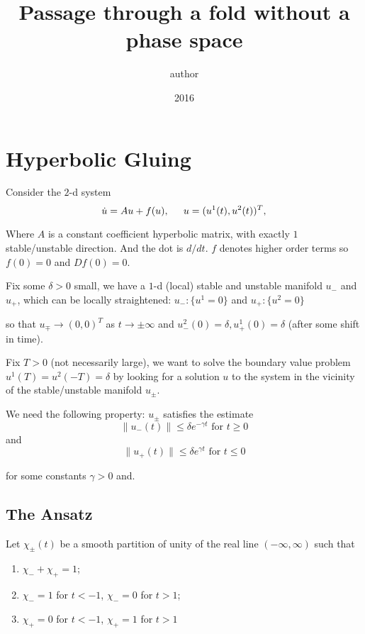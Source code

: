 \documentclass[letterpaper,11pt]{article}
\title{Passage through a fold without a phase space}
\author{author}
\date{2016}
\numberwithin{equation}{section}
\theoremstyle{plain}
\begin{document}
\iffalse
\section{Introduction}

Nonlocal models describe a wealth of phenomena, neural field


-(SP?) PDE dynamics under slowly varying parameters..(even in ODE!)


\begin{itemize}

\item Setup 
\item goal
\end{itemize}
\fi


\section{Hyperbolic Gluing}
Consider the $2$-d system
\[
\dot{u} = Au + f(u), \hspace{0.2in} u=(u^1(t),u^2(t))^T,
\] 

Where $A$ is a constant coefficient hyperbolic matrix, with exactly $1$ stable/unstable direction. And the dot is $d/dt$. $f$ denotes higher order terms so $f(0)=0$ and $Df(0)=0$.

Fix some $\delta > 0$ small, we have a $1$-d (local) stable and unstable manifold $u_{-}$ and $u_{+}$, which can be locally straightened: $u_- : \{u^1 = 0\}$ and $u_+ : \{ u^2 = 0\}$

so that $u_{\mp} \to (0,0)^T$ as $t\to \pm \infty$ and $u_{-}^2 (0) =\delta, u_{+}^1 (0) =\delta$ (after some shift in time).

Fix $T > 0$ (not necessarily large), we want to solve the boundary value problem $u^1(T) = u^2(-T)=\delta$ by looking for a solution $u$ to the system in the vicinity of the stable/unstable manifold $u_{\pm}$.

We need the following property: $u_{\pm}$ satisfies the estimate
\[
\|u_-(t)\| \le \delta e^{-\gamma t} \text{ for }t\ge 0
\]
and
\[
\|u_+(t)\| \le \delta e^{\gamma t} \text{ for }t \le 0
\]

for some constants $\gamma >0$ and.

\subsection{The Ansatz}

Let $\chi_{\pm}(t)$ be a smooth partition of unity of the real line $(-\infty,\infty)$ such that 
\begin{enumerate}	
\item $\chi_{-}+\chi_+= 1$; 
\item $\chi_{-} = 1$ for $t<-1$, $\chi_- =0$ for $t>1$;
\item $\chi_+ = 0$ for $t<-1$, $\chi_+ =1$ for $t>1$ 
\end{enumerate}
\end{document}

